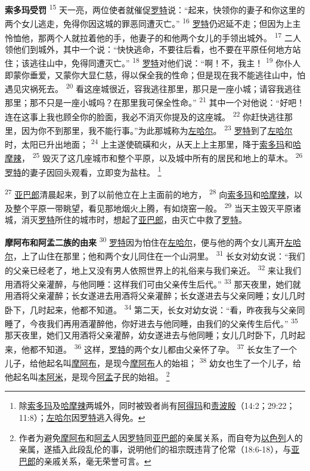 \textbf{索多玛受罚\quad}
\textsuperscript{15}
天一亮，两位使者就催促\uline{罗特}说：“起来，快领你的妻子和你这里的两个女儿逃走，免得你因这城的罪恶同遭灭亡。”
\textsuperscript{16}
\uline{罗特}仍迟延不走；但因为上主怜恤他，那两个人就拉着他的手，他妻子的和他两个女儿的手领出城外。
\textsuperscript{17}
二人领他们到城外，其中一个说：“快快逃命，不要往后看，也不要在平原任何地方站住；该逃往山中，免得同遭灭亡。”
\textsuperscript{18}
\uline{罗特}对他们说：“啊！不，我主！
\textsuperscript{19}
你仆人即蒙你垂爱，又蒙你大显仁慈，得以保全我的性命；但是现在我不能逃往山中，怕遇见灾祸死去。
\textsuperscript{20}
看这座城很近，容我逃往那里，那只是一座小城；请容我逃往那里；那不只是一座小城吗？在那里我可保全性命。”
\textsuperscript{21}
其中一个对他说：“好吧！连在这事上我也顾全你的脸面，我必不消灭你提及的这座城。
\textsuperscript{22}
你赶快逃往那里，因为你不到那里，我不能行事。”为此那城称为\uline{左哈尔}。
\textsuperscript{23}
\uline{罗特}到了\uline{左哈尔}时，太阳已升出地面；
\textsuperscript{24}
上主遂使硫磺和火，从天上上主那里，降于\uline{索多玛}和\uline{哈摩辣}，
\textsuperscript{25}
毁灭了这几座城市和整个平原，以及城中所有的居民和地上的草木。
\textsuperscript{26}
\uline{罗特}的妻子因回头观看，立即变为盐柱。
\footnote{除\uline{索多玛}及\uline{哈摩辣}两城外，同时被毁者尚有\uline{阿得玛}和\uline{责波殷}（14:2；29:22；11:8）；\uline{左哈尔}因\uline{罗特}逃入得免。}

\textsuperscript{27}
\uline{亚巴郎}清晨起来，到了以前他立在上主面前的地方，
\textsuperscript{28}
向\uline{索多玛}和\uline{哈摩辣}，以及整个平原一带眺望，看见那地烟火上腾，有如烧窑一般。
\textsuperscript{29}
当天主毁灭平原诸城，消灭\uline{罗特}所住的城市时，想起了\uline{亚巴郎}，由灭亡中救了\uline{罗特}。

\textbf{摩阿布和阿孟二族的由来\quad}
\textsuperscript{30}
\uline{罗特}因为怕住在\uline{左哈尔}，便与他的两个女儿离开\uline{左哈尔}，上了山住在那里；他和两个女儿同住在一个山洞里。
\textsuperscript{31}
长女对幼女说：“我们的父亲已经老了，地上又没有男人依照世界上的礼俗来与我们亲近。
\textsuperscript{32}
来让我们用酒将父亲灌醉，与他同睡：这样我们可由父亲传生后代。”
\textsuperscript{33}
那天夜里，她们就用酒将父亲灌醉；长女遂进去用酒将父亲灌醉；长女遂进去与父亲同睡；女儿几时卧下，几时起来，他都不知道。
\textsuperscript{34}
第二天，长女对幼女说：“看，昨夜我与父亲同睡了，今夜我们再用酒灌醉他，你好进去与他同睡，由我们的父亲传生后代。”
\textsuperscript{35}
那天夜里，她们又用酒将父亲灌醉，幼女遂进去与他同睡；女儿几时卧下，几时起来，他都不知道。
\textsuperscript{36}
这样，\uline{罗特}的两个女儿都由父亲怀了孕。
\textsuperscript{37}
长女生了一个儿子，给他起名叫\uline{摩阿布}，是现今\uline{摩阿布}人的始祖；
\textsuperscript{38}
幼女也生了一个儿子，给他起名叫\uline{本阿米}，是现今\uline{阿孟}子民的始祖。
\footnote{作者为避免\uline{摩阿布}和\uline{阿孟}人因\uline{罗特}同\uline{亚巴郎}的亲属关系，而自夸为\uline{以色列}人的亲属，遂插入此段乱伦的事，说明他们的祖宗既违背了伦常（18:6-18），与\uline{亚巴郎}的亲戚关系，毫无荣誉可言。}

